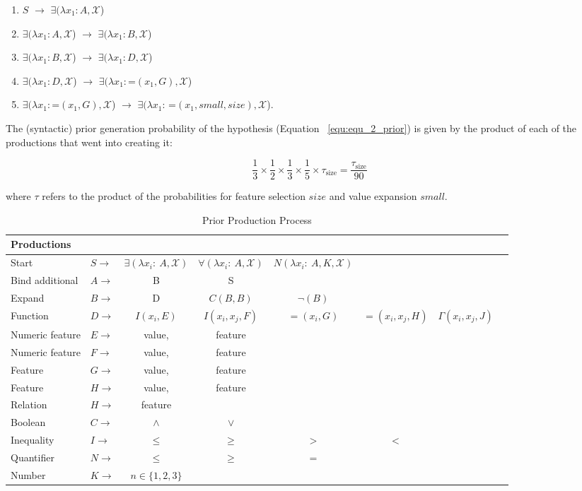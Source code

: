 \documentclass[doc,natbib,floatsintext]{apa7}
\newcommand{\xx}{\mathcal{X}} %
\begin{document}
\begin{appendices}
\begin{enumerate}
    \item \(S\) \(\rightarrow\) \(\exists(\lambda x_{1}: A,\xx\))
    \item \(\exists(\lambda x_{1}: A,\xx\)) \(\rightarrow\) \(\exists(\lambda x_{1}: B,\xx\))
    \item \(\exists(\lambda x_{1}: B,\xx\)) \(\rightarrow\) \(\exists(\lambda x_{1}: D,\xx\))
    \item \(\exists(\lambda x_{1}: D,\xx\)) \(\rightarrow\) \(\exists(\lambda x_{1}:  \text{=}(x_1,G),\xx\))
    \item \(\exists(\lambda x_{1}:  \text{=}(x_1,G),\xx\)) \(\rightarrow\) \(\exists(\lambda x_{1}\text{: }  \text{=}(x_1,small,size),\xx\)).
\end{enumerate}


The (syntactic) prior generation probability of the hypothesis (Equation~ \ref{equ:equ_2_prior}) is given by the product of each of the productions that went into creating it: 


\begin{equation}
    \frac{1}{3}\times\frac{1}{2}\times\frac{1}{3}\times  \frac{1}{5} \times \tau_{\mathrm{size}}= \frac{\tau_{\mathrm{size}}}{90}
\label{equ:equ_a1_1_prior_example}
\end{equation}

where $\tau$ refers to the product of the probabilities for feature selection $size$ and value expansion $small$.  


\begin{table}[H]
\centering
\caption{Prior Production Process}
\scriptsize{
\begin{tabular}{llcccccc}
\toprule
Productions\\
\midrule
Start & $S\rightarrow$ & $\exists(\lambda\!x_i\!:~A,\xx)$ & $\forall(\lambda\!x_i\!:~A,\xx)$ & 
$N(\lambda\!x_i\!:~A, K,\xx)$\\
Bind additional & $A\rightarrow$ & B & S\\
Expand & $B\rightarrow$ & D & $C(B,B)$ & $\neg(B)$ \\
Function & $D\rightarrow$ &  $I(x_i, E)$ & $I(x_i,x_j,F)$ & $=\!(x_i, G)$ & $=\!(x_i, x_j, H)$ & $\Gamma(x_i, x_j,J)$ \\
Numeric feature & $E\rightarrow$ & value, & feature\\
Numeric feature & $F\rightarrow$ & value, & feature\\
Feature & $G\rightarrow$ & value, & feature\\
Feature & $H\rightarrow$ & value, & feature\\
Relation & $H\rightarrow$ & feature\\
Boolean & $C\rightarrow$ & $\land$ & $\lor$\\
Inequality & $I\rightarrow$ & $\leq$ & $\geq$ & $>$ & $<$\\
Quantifier & $N\rightarrow$ & $\leq$ & $\geq$ & $=$ \\
Number & $K\rightarrow$ & $n\in\{1,2,3\}$\\
\bottomrule
\end{tabular}
\label{table:table_a1_1_productions}

}
\end{table}
\end{appendices}
\end{document}
